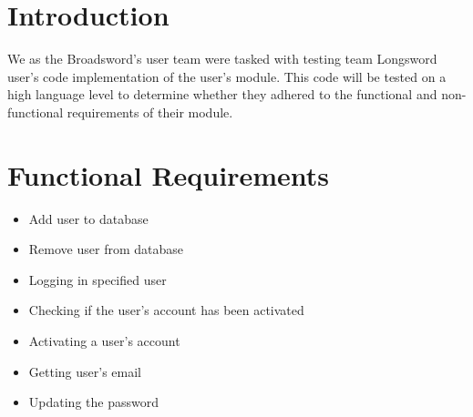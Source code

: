 


  
  \section{Introduction}
 We as the Broadsword's user team were tasked with testing team Longsword user’s code implementation of the user's module. This code will be tested on a high language level to determine whether they adhered to the functional and non-functional requirements of their module.
 
  \section{Functional Requirements}
\begin{itemize}
\item Add user to database
\item Remove user from database
\item Logging in specified user
\item Checking if the user’s account has been activated
\item Activating a user’s account
\item Getting user’s email
\item Updating the password
\end{itemize}
